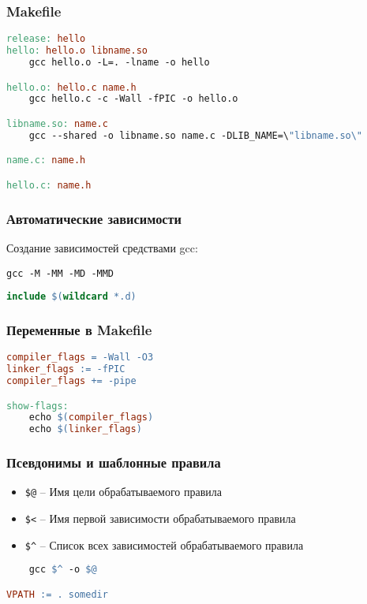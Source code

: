 \begin{frame}[fragile]
	\frametitle{Makefile}

	\begin{lstlisting}[language=make]
release: hello
hello: hello.o libname.so
    gcc hello.o -L=. -lname -o hello

hello.o: hello.c name.h
    gcc hello.c -c -Wall -fPIC -o hello.o

libname.so: name.c
    gcc --shared -o libname.so name.c -DLIB_NAME=\"libname.so\"

name.c: name.h

hello.c: name.h
	\end{lstlisting}
\end{frame}

\begin{frame}[fragile]
	\frametitle{Автоматические зависимости}

	Создание зависимостей средствами gcc:

	\begin{verbatim}
gcc -M -MM -MD -MMD
	\end{verbatim}

	\begin{lstlisting}[language=make]
include $(wildcard *.d)
	\end{lstlisting}
\end{frame}

\begin{frame}[fragile]
	\frametitle{Переменные в Makefile}
	\begin{lstlisting}[language=make]
compiler_flags = -Wall -O3
linker_flags := -fPIC
compiler_flags += -pipe

show-flags:
    echo $(compiler_flags)
    echo $(linker_flags)
	\end{lstlisting}
\end{frame}

\begin{frame}[fragile]
	\frametitle{Псевдонимы и шаблонные правила}

	\begin{itemize}
		\item {\tt \$@} -- Имя цели обрабатываемого правила
		\item {\tt \$<} -- Имя первой зависимости обрабатываемого правила 
		\item {\tt \$\^{}} -- Список всех зависимостей обрабатываемого правила
	\end{itemize}

	\begin{lstlisting}[language=make]
%.o: %.c
    gcc $^ -o $@

VPATH := . somedir
	\end{lstlisting}
\end{frame}

